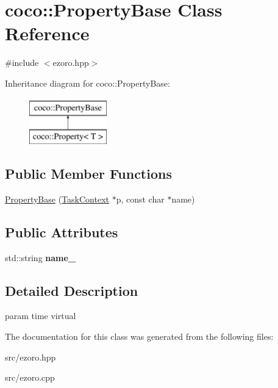 \hypertarget{classcoco_1_1_property_base}{\section{coco\-:\-:Property\-Base Class Reference}
\label{classcoco_1_1_property_base}
}


{\ttfamily \#include $<$ezoro.\-hpp$>$}

Inheritance diagram for coco\-:\-:Property\-Base\-:\begin{figure}[H]
\begin{center}
\leavevmode
\includegraphics[height=2.000000cm]{classcoco_1_1_property_base}
\end{center}
\end{figure}
\subsection*{Public Member Functions}
\begin{DoxyCompactItemize}
\item 
\hypertarget{classcoco_1_1_property_base_a9bf02d050d7a7384c7ede2b953c5e513}{\hyperlink{classcoco_1_1_property_base_a9bf02d050d7a7384c7ede2b953c5e513}{Property\-Base} (\hyperlink{classcoco_1_1_task_context}{Task\-Context} $\ast$p, const char $\ast$name)}\label{classcoco_1_1_property_base_a9bf02d050d7a7384c7ede2b953c5e513}

\begin{DoxyCompactList}\small\item\em 

 \end{DoxyCompactList}\end{DoxyCompactItemize}
\subsection*{Public Attributes}
\begin{DoxyCompactItemize}
\item 
\hypertarget{classcoco_1_1_property_base_a3fb931fae2c256d9ff587d82c5ffcc43}{std\-::string {\bfseries name\-\_\-}}\label{classcoco_1_1_property_base_a3fb931fae2c256d9ff587d82c5ffcc43}

\end{DoxyCompactItemize}


\subsection{Detailed Description}
param time  virtual 

The documentation for this class was generated from the following files\-:\begin{DoxyCompactItemize}
\item 
src/ezoro.\-hpp\item 
src/ezoro.\-cpp\end{DoxyCompactItemize}
